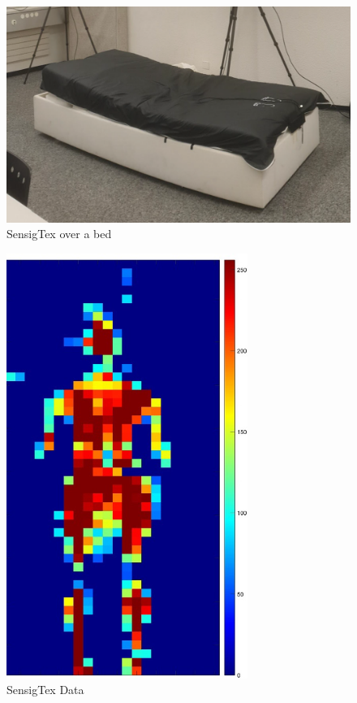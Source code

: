 \vspace*{0.5cm}
\begin{figure}[H]
    \centering
    \includegraphics[width=\textwidth]{img/sensingTex.png}
    \caption{SensigTex over a bed}
    \label{fig:sensingtex}
\end{figure}

\begin{figure}[p]
    \centering
    \includegraphics[width=0.7\textwidth]{img/sensingtex_2.jpg}
    \caption{SensigTex Data }
    \label{fig:sensingtexData}
\end{figure}

